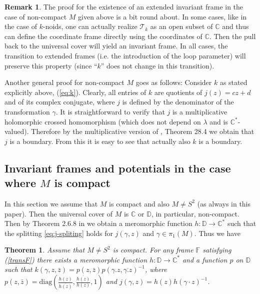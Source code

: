 \documentclass[a4paper,11pt]{amsart}
\newtheorem{theorem}{Theorem}[section]
\theoremstyle{definition}
\newtheorem{remark}{Remark}
\numberwithin{equation}{section}
\newcommand{\C}{\mathbb{C}}
\newcommand{\D}{\mathbb{D}}
\newcommand{\F}{\mathbb{F}}
\begin{document}
\begin{remark}
 The proof for the existence of an extended invariant frame in the case of non-compact $M$ given above is a bit round about. In some cases, like in the case of $k$-noids, one can actually realize 
$\mathcal{T}_k$ as an open subset of $\C$ and thus can define the coordinate frame directly  using the coordinates of $\C$. Then the  pull back to the universal cover will yield an invariant frame. In all cases, the transition to extended frames (i.e. the introduction of the loop parameter) will preserve this property (since ``$k$'' does not change in this transition).


 Another general proof for non-compact $M$ goes as follows: Consider $k$ as stated explicitly above, (\ref{eq:k}). Clearly, all entries of $k$ are quotients of $j(z) = cz + d$ and of its complex conjugate, where $j$ is defined by the denominator of the transformation $\gamma$.
It is straightforward to verify that $j$ is a multiplicative holomorphic crossed homomorphism (which does not depend on $\lambda$ and is $\C^*$-valued). Therefore by the multiplicative version of \cite{Forster}, Theorem 28.4 we obtain that $j$ is a boundary. From this it is easy to see that actually also $k$ is a boundary. 
\end{remark}

\subsection{Invariant frames and potentials in the case where $M$ is compact}
\label{sec:compact}

In this section we assume that $M$ is compact and also $M \neq S^2$ (as always in this paper). Then the universal cover of $M$ is $\mathbb{C}$ or $\mathbb{D}$, in particular, non-compact. Then by Theorem 2.6.8 in \cite{Miyake} we obtain a meromorphic function $h:\D \rightarrow \C^*$ such that the splitting  \eqref{eq:j-spliting} holds for $j(\gamma, z)$ and $\gamma\in \pi_1(M)$. Thus we have


\begin{theorem}
Assume that $M\neq S^2$ is compact. For any frame $\F$ satisfying (\ref{transF})
there exists  a meromorphic function $h:\D\rightarrow \C^*$ and a function $p$ on $\D$ such that 
$k(\gamma, z, \bar{z})=p(z, \bar{z})p(\gamma . z, \overline{\gamma . z})^{-1}$, where $p(z, \bar{z})=\mathrm{diag}(\frac{h(z)}{\overline{h(z)}}, \frac{\overline{h(z)}}{h(z)}, 1)$ and $j(\gamma, z)=h(z)h(\gamma\cdot z)^{-1}$. 
\end{theorem}
\end{document}
